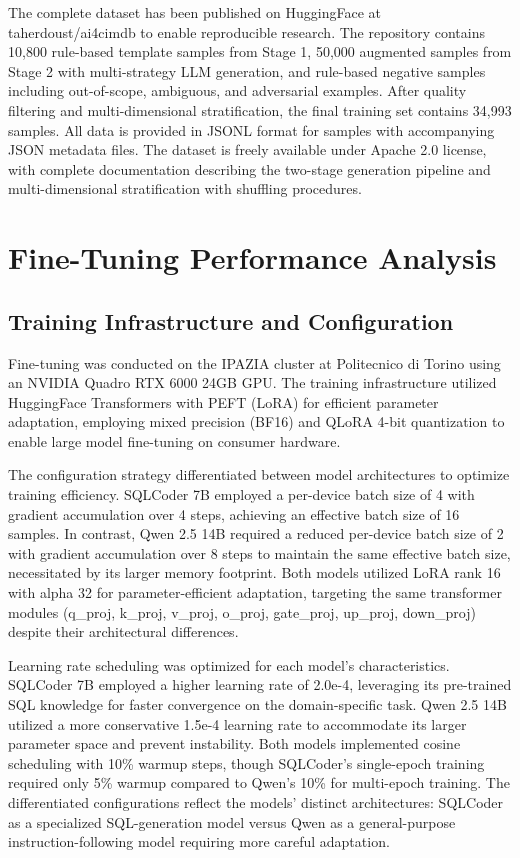 The complete dataset has been published on HuggingFace at taherdoust/ai4cimdb to enable reproducible research. The repository contains 10,800 rule-based template samples from Stage 1, 50,000 augmented samples from Stage 2 with multi-strategy LLM generation, and rule-based negative samples including out-of-scope, ambiguous, and adversarial examples. After quality filtering and multi-dimensional stratification, the final training set contains 34,993 samples. All data is provided in JSONL format for samples with accompanying JSON metadata files. The dataset is freely available under Apache 2.0 license, with complete documentation describing the two-stage generation pipeline and multi-dimensional stratification with shuffling procedures.


\section{Fine-Tuning Performance Analysis}

\subsection{Training Infrastructure and Configuration}

Fine-tuning was conducted on the IPAZIA cluster at Politecnico di Torino using an NVIDIA Quadro RTX 6000 24GB GPU. The training infrastructure utilized HuggingFace Transformers with PEFT (LoRA) for efficient parameter adaptation, employing mixed precision (BF16) and QLoRA 4-bit quantization to enable large model fine-tuning on consumer hardware.

The configuration strategy differentiated between model architectures to optimize training efficiency. SQLCoder 7B employed a per-device batch size of 4 with gradient accumulation over 4 steps, achieving an effective batch size of 16 samples. In contrast, Qwen 2.5 14B required a reduced per-device batch size of 2 with gradient accumulation over 8 steps to maintain the same effective batch size, necessitated by its larger memory footprint. Both models utilized LoRA rank 16 with alpha 32 for parameter-efficient adaptation, targeting the same transformer modules (q\_proj, k\_proj, v\_proj, o\_proj, gate\_proj, up\_proj, down\_proj) despite their architectural differences.

Learning rate scheduling was optimized for each model's characteristics. SQLCoder 7B employed a higher learning rate of 2.0e-4, leveraging its pre-trained SQL knowledge for faster convergence on the domain-specific task. Qwen 2.5 14B utilized a more conservative 1.5e-4 learning rate to accommodate its larger parameter space and prevent instability. Both models implemented cosine scheduling with 10\% warmup steps, though SQLCoder's single-epoch training required only 5\% warmup compared to Qwen's 10\% for multi-epoch training. The differentiated configurations reflect the models' distinct architectures: SQLCoder as a specialized SQL-generation model versus Qwen as a general-purpose instruction-following model requiring more careful adaptation.

